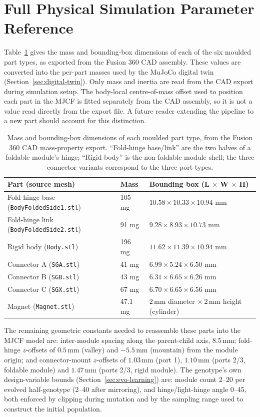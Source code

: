 \documentclass[12pt,a4paper]{report}
\begin{document}
\section{Full Physical Simulation Parameter Reference}
\label{app:params}
Table~\ref{tab:parts-appendix} gives the mass and bounding-box dimensions of each of the six moulded part types, as exported from the Fusion 360 CAD assembly. These values are converted into the per-part masses used by the MuJoCo digital twin (Section~\ref{sec:digital-twin}). Only mass and inertia are read from the CAD export during simulation setup. The body-local centre-of-mass offset used to position each part in the MJCF is fitted separately from the CAD assembly, so it is not a value read directly from the export file. A future reader extending the pipeline to a new part should account for this distinction.

\begin{table}[htbp]
\centering
\footnotesize
\caption{Mass and bounding-box dimensions of each moulded part type, from the Fusion 360 CAD mass-property export. ``Fold-hinge base/link'' are the two halves of a foldable module's hinge; ``Rigid body'' is the non-foldable module shell; the three connector variants correspond to the three port types.}
\label{tab:parts-appendix}
\begin{tabular}{@{}lp{2cm}p{5.4cm}@{}}
\toprule
\textbf{Part (source mesh)} & \textbf{Mass} & \textbf{Bounding box (L $\times$ W $\times$ H)} \\
\midrule
Fold-hinge base (\texttt{BodyFoldedSide1.stl}) & 105 mg & $10.58 \times 10.33 \times 10.94$ mm \\
Fold-hinge link (\texttt{BodyFoldedSide2.stl}) & 91 mg & $9.28 \times 8.93 \times 10.73$ mm \\
Rigid body (\texttt{Body.stl}) & 196 mg & $11.62 \times 11.39 \times 10.94$ mm \\
Connector A (\texttt{SGA.stl}) & 41 mg & $6.99 \times 5.24 \times 6.50$ mm \\
Connector B (\texttt{SGB.stl}) & 43 mg & $6.31 \times 6.65 \times 6.26$ mm \\
Connector C (\texttt{SGX.stl}) & 67 mg & $6.70 \times 6.65 \times 6.56$ mm \\
Magnet (\texttt{Magnet.stl}) & 47.1 mg & $2\,\mathrm{mm}$ diameter $\times\ 2\,\mathrm{mm}$ height (cylinder) \\
\bottomrule
\end{tabular}
\end{table}

The remaining geometric constants needed to reassemble these parts into the MJCF model are: inter-module spacing along the parent-child axis, $8.5\,\mathrm{mm}$; fold-hinge $z$-offsets of $0.5\,\mathrm{mm}$ (valley) and $-5.5\,\mathrm{mm}$ (mountain) from the module origin; and connector-mount $z$-offsets of $1.03\,\mathrm{mm}$ (port 1), $1.10\,\mathrm{mm}$ (ports 2/3, foldable module) and $1.47\,\mathrm{mm}$ (ports 2/3, rigid module). The genotype's own design-variable bounds (Section~\ref{sec:evo-learning}) are: module count 2--20 per evolved half-genotype (2--40 after mirroring), and hinge/light-hinge angle 0\textdegree--45\textdegree, both enforced by clipping during mutation and by the sampling range used to construct the initial population.
\end{document}
